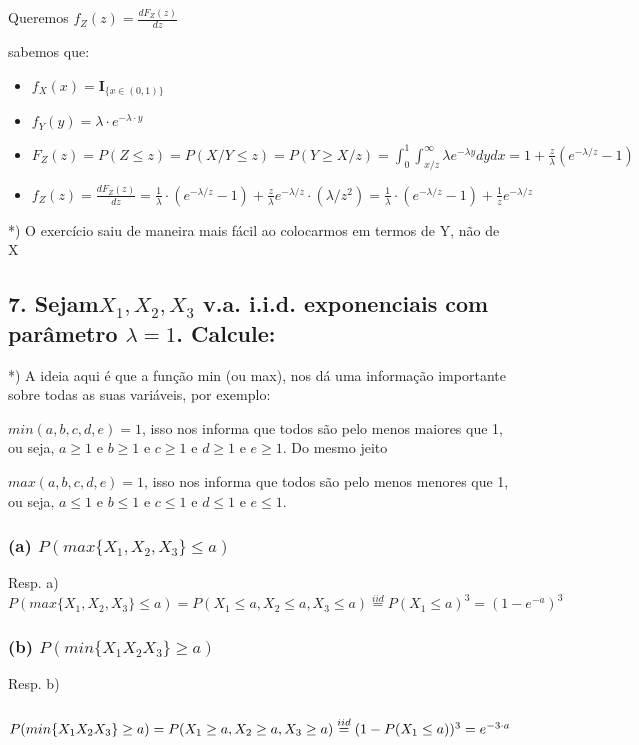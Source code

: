 \documentclass[english]{article}
\begin{document}
Queremos $f_{Z}(z)=\frac{dF_{Z}(z)}{dz}$

sabemos que:
\begin{itemize}
\item $f_{X}(x)=\mathbf{I}_{\{x\in(0,1)\}}$
\item $f_{Y}(y)=\lambda\cdot e^{-\lambda\cdot y}$
\item $F_{Z}(z)=P(Z\leq z)=P(X/Y\leq z)=P(Y\ge X/z)=\int_{0}^{1}\int_{x/z}^{\infty}\lambda e^{-\lambda y}dydx=1+\frac{z}{\lambda}(e^{-\lambda/z}-1)$
\item $f_{Z}(z)=\frac{dF_{Z}(z)}{dz}=\frac{1}{\lambda}\cdot(e^{-\lambda/z}-1)+\frac{z}{\lambda}e^{-\lambda/z}\cdot(\lambda/z^{2})=\frac{1}{\lambda}\cdot(e^{-\lambda/z}-1)+\frac{1}{z}e^{-\lambda/z}$
\end{itemize}
{*}) O exercício saiu de maneira mais fácil ao colocarmos em termos
de Y, não de X


\subsection*{\textmd{7. Sejam$X_{1},X_{2},X_{3}$ v.a. i.i.d. exponenciais com
parâmetro $\lambda=1$. Calcule: }}

{*}) A ideia aqui é que a função min (ou max), nos dá uma informação
importante sobre todas as suas variáveis, por exemplo:

$min(a,b,c,d,e)=1$, isso nos informa que todos são pelo menos maiores
que 1, ou seja, $a\geq1$ e $b\geq1$ e $c\geq1$ e $d\geq1$ e $e\geq1$.
Do mesmo jeito

$max(a,b,c,d,e)=1$, isso nos informa que todos são pelo menos menores
que 1, ou seja, $a\leq1$ e $b\leq1$ e $c\leq1$ e $d\leq1$ e $e\leq1$.


\subsubsection*{\textmd{(a) $P(max\{X_{1},X_{2},X_{3}\}\leq a)$}}

Resp. a) $P(max\{X_{1},X_{2},X_{3}\}\leq a)=P(X_{1}\leq a,X_{2}\leq a,X_{3}\leq a)\overset{iid}{=}P(X_{1}\leq a)^{3}=(1-e^{-a})^{3}$


\subsubsection*{\textmd{(b) $P(min\{X_{1}X_{2}X_{3}\}\geq a)$}}

Resp. b)


\subsubsection*{\textmd{$P(min\{X_{1}X_{2}X_{3}\}\geq a)=P(X_{1}\geq a,X_{2}\geq a,X_{3}\geq a)\protect\overset{iid}{=}(1-P(X_{1}\leq a))^{3}=e^{-3\cdot a}$}}
\end{document}
